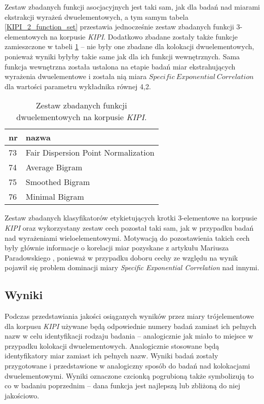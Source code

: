 Zestaw zbadanych funkcji asocjacyjnych jest taki sam, jak dla badań nad miarami ekstrakcji wyrażeń dwuelementowych, a tym samym tabela \ref{KIPI_2_function_set} przestawia jednocześnie zestaw zbadanych funkcji 3-elementowych na korpusie \emph{KIPI}.
Dodatkowo zbadane zostały także funkcje zamieszczone w tabeli \ref{KIPI_3_add_function_set} -- nie były one zbadane dla kolokacji dwuelementowych, ponieważ wyniki byłyby takie same jak dla ich funkcji wewnętrznych.
Sama funkcja wewnętrzna została ustalona na etapie badań miar ekstrahujących wyrażenia dwuelementowe i została nią miara $ Specific \: Exponential \: Correlation $ dla wartości parametru wykładnika równej 4,2.
\begin{table}[h!]
\centering
\footnotesize\setlength{\tabcolsep}{2.5pt}
\begin{tabular}{ l | l }
	\toprule
	\textbf{nr}  	& \textbf{nazwa}  \\
	\midrule
	73	& Fair Dispersion Point Normalization \\
	74	& Average Bigram \\
	75	& Smoothed Bigram \\
	76	& Minimal Bigram \\
	\bottomrule
\end{tabular}
\caption[Zestaw zbadanych funkcji dwuelementowych na korpusie \emph{KIPI}]{Zestaw zbadanych funkcji dwuelementowych na korpusie \emph{KIPI}.}
\label{KIPI_3_add_function_set}
\end{table}

Zestaw zbadanych klasyfikatorów etykietujących krotki 3-elementowe na korpusie \emph{KIPI} oraz wykorzystany zestaw cech pozostał taki sam, jak w przypadku badań nad wyrażeniami wieloelementowymi.
Motywacją do pozostawienia takich cech były głównie informacje o korelacji miar pozyskane z artykułu Mariusza Paradowskiego \cite{paradowski_beta}, ponieważ w przypadku doboru cechy ze względu na wynik pojawił się problem dominacji miary \emph{Specific Exponential Correlation} nad innymi.


\subsection{Wyniki}
Podczas przedstawiania jakości osiąganych wyników przez miary trójelementowe dla korpusu \emph{KIPI} używane będą odpowiednie numery badań zamiast ich pełnych nazw w celu identyfikacji rodzaju badania -- analogicznie jak miało to miejsce w przypadku kolokacji dwuelementowych.
Analogicznie stosowane będą identyfikatory miar zamiast ich pełnych nazw.
Wyniki badań zostały przygotowane i przedstawione w analogiczny sposób do badań nad kolokacjami dwuelementowymi.
Wyniki oznaczone czcionką pogrubioną także symbolizują to co w badaniu poprzednim -- dana funkcja jest najlepszą lub zbliżoną do niej jakościowo.

